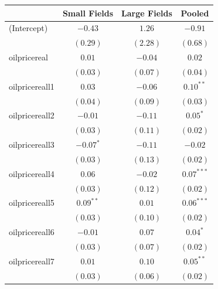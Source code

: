 \documentclass[11pt]{article}
\begin{document}
\begin{spacing}{1}

\begin{table}
\begin{center}
\begin{tabular}{l c c c }
\hline
                                     & Small Fields & Large Fields & Pooled \\
\hline
(Intercept)                          & $-0.43$       & $1.26$        & $-0.91$       \\
                                     & $(0.29)$      & $(2.28)$      & $(0.68)$      \\
oilpricereal                       & $0.01$        & $-0.04$       & $0.02$        \\
                                     & $(0.03)$      & $(0.07)$      & $(0.04)$      \\
oilpricereall1                    & $0.03$        & $-0.06$       & $0.10^{**}$   \\
                                     & $(0.04)$      & $(0.09)$      & $(0.03)$      \\
oilpricereall2                    & $-0.01$       & $-0.11$       & $0.05^{*}$    \\
                                     & $(0.03)$      & $(0.11)$      & $(0.02)$      \\
oilpricereall3                    & $-0.07^{*}$   & $-0.11$       & $-0.02$       \\
                                     & $(0.03)$      & $(0.13)$      & $(0.02)$      \\
oilpricereall4                    & $0.06$        & $-0.02$       & $0.07^{***}$  \\
                                     & $(0.03)$      & $(0.12)$      & $(0.02)$      \\
oilpricereall5                    & $0.09^{**}$   & $0.01$        & $0.06^{***}$  \\
                                     & $(0.03)$      & $(0.10)$      & $(0.02)$      \\
oilpricereall6                    & $-0.01$       & $0.07$        & $0.04^{*}$    \\
                                     & $(0.03)$      & $(0.07)$      & $(0.02)$      \\
oilpricereall7                    & $0.01$        & $0.10$        & $0.05^{**}$   \\
                                     & $(0.03)$      & $(0.06)$      & $(0.02)$      \\

\end{tabular}
\end{center}
\end{table}
\end{spacing}
\end{document}

